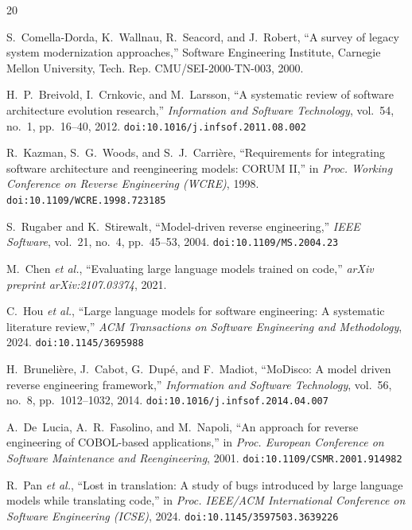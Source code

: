 \documentclass[conference]{IEEEtran}
\begin{document}

\begin{thebibliography}{20}

S.~Comella-Dorda, K.~Wallnau, R.~Seacord, and J.~Robert, ``A survey of legacy system modernization approaches,'' Software Engineering Institute, Carnegie Mellon University, Tech. Rep. CMU/SEI-2000-TN-003, 2000.

H.~P.~Breivold, I.~Crnkovic, and M.~Larsson, ``A systematic review of software architecture evolution research,'' \textit{Information and Software Technology}, vol.~54, no.~1, pp.~16--40, 2012. \texttt{doi:10.1016/j.infsof.2011.08.002}

R.~Kazman, S.~G.~Woods, and S.~J.~Carri\`{e}re, ``Requirements for integrating software architecture and reengineering models: CORUM II,'' in \textit{Proc. Working Conference on Reverse Engineering (WCRE)}, 1998. \texttt{doi:10.1109/WCRE.1998.723185}

S.~Rugaber and K.~Stirewalt, ``Model-driven reverse engineering,'' \textit{IEEE Software}, vol.~21, no.~4, pp.~45--53, 2004. \texttt{doi:10.1109/MS.2004.23}

M.~Chen \textit{et al.}, ``Evaluating large language models trained on code,'' \textit{arXiv preprint arXiv:2107.03374}, 2021.

C.~Hou \textit{et al.}, ``Large language models for software engineering: A systematic literature review,'' \textit{ACM Transactions on Software Engineering and Methodology}, 2024. \texttt{doi:10.1145/3695988}

H.~Bruneli\`{e}re, J.~Cabot, G.~Dup\'{e}, and F.~Madiot, ``MoDisco: A model driven reverse engineering framework,'' \textit{Information and Software Technology}, vol.~56, no.~8, pp.~1012--1032, 2014. \texttt{doi:10.1016/j.infsof.2014.04.007}

A.~De~Lucia, A.~R.~Fasolino, and M.~Napoli, ``An approach for reverse engineering of COBOL-based applications,'' in \textit{Proc. European Conference on Software Maintenance and Reengineering}, 2001. \texttt{doi:10.1109/CSMR.2001.914982}

R.~Pan \textit{et al.}, ``Lost in translation: A study of bugs introduced by large language models while translating code,'' in \textit{Proc. IEEE/ACM International Conference on Software Engineering (ICSE)}, 2024. \texttt{doi:10.1145/3597503.3639226}


\end{thebibliography}
\end{document}

